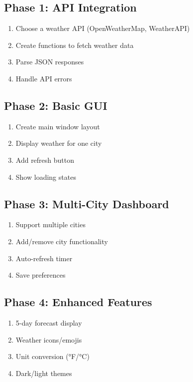 \documentclass[
  letterpaper,
  DIV=11,
  numbers=noendperiod,
  oneside]{scrreprt}
\providecommand{\tightlist}{%
  \setlength{\itemsep}{0pt}\setlength{\parskip}{0pt}}\usepackage{longtable,booktabs,array}
\begin{document}
\subsection{Phase 1: API Integration}\label{phase-1-api-integration}

\begin{enumerate}
\def\labelenumi{\arabic{enumi}.}
\tightlist
\item
  Choose a weather API (OpenWeatherMap, WeatherAPI)
\item
  Create functions to fetch weather data
\item
  Parse JSON responses
\item
  Handle API errors
\end{enumerate}

\subsection{Phase 2: Basic GUI}\label{phase-2-basic-gui}

\begin{enumerate}
\def\labelenumi{\arabic{enumi}.}
\tightlist
\item
  Create main window layout
\item
  Display weather for one city
\item
  Add refresh button
\item
  Show loading states
\end{enumerate}

\subsection{Phase 3: Multi-City
Dashboard}\label{phase-3-multi-city-dashboard}

\begin{enumerate}
\def\labelenumi{\arabic{enumi}.}
\tightlist
\item
  Support multiple cities
\item
  Add/remove city functionality
\item
  Auto-refresh timer
\item
  Save preferences
\end{enumerate}

\subsection{Phase 4: Enhanced Features}\label{phase-4-enhanced-features}

\begin{enumerate}
\def\labelenumi{\arabic{enumi}.}
\tightlist
\item
  5-day forecast display
\item
  Weather icons/emojis
\item
  Unit conversion (°F/°C)
\item
  Dark/light themes
\end{enumerate}
\end{document}
